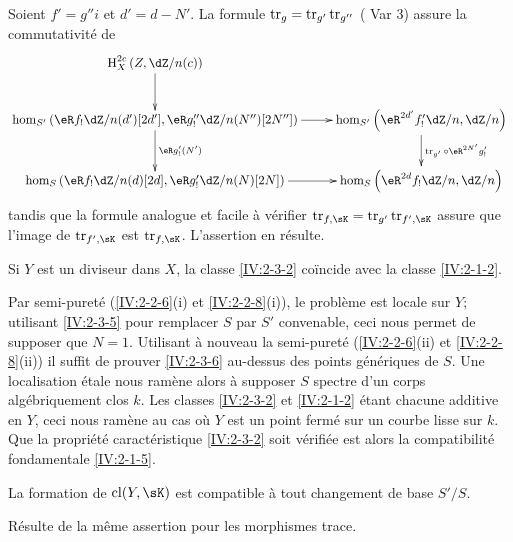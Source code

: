 Soient $f'=g'' i$ et $d'=d-N'$. La formule $\operatorname{tr}_g=\operatorname{tr}_{g'}\operatorname{tr}_{g''}$ 
(\cite[XVIII.2.9]{sga4} Var 3) assure la commutativité de 
\[\xymatrix{
  \h_X^{2 c}\left(Z,\dZ/n(c)\right) \ar[d] \\
  \hom_{S'}\left(\eR f_!\dZ/n(d')[2 d'],\eR g_!''\dZ/n(N'')[2 N'']\right) \ar[r] \ar[d]^-{\eR g_!'(N')} 
    & \hom_{S'}\left(\eR^{2 d'} f_!' \dZ/n,\dZ/n\right) \ar[d]^-{\tr_{g'}\circ \eR^{2 N'} g_!'} \\
  \hom_S\left(\eR f_!\dZ/n(d)[2d],\eR g_!'\dZ/n(N)[2 N]\right) \ar[r] 
    & \hom_S\left(\eR^{2 d} f_!\dZ/n,\dZ/n\right)
}\]
tandis que la formule analogue et facile à vérifier 
$\tr_{f,\sK}=\tr_{g'}\tr_{f',\sK}$ assure que l'image de $\tr_{f',\sK}$ est 
$\tr_{f,\sK}$. L'assertion en résulte. 





\begin{lemma}\label{IV:2-3-6}
Si $Y$ est un diviseur dans $X$, la classe \ref{IV:2-3-2} coïncide avec la 
classe \ref{IV:2-1-2}. 
\end{lemma}

Par semi-pureté (\ref{IV:2-2-6}(i) et \ref{IV:2-2-8}(i)), le problème est 
locale sur $Y$; utilisant \ref{IV:2-3-5} pour remplacer $S$ par $S'$ 
convenable, ceci nous permet de supposer que $N=1$. Utilisant à nouveau la 
semi-pureté (\ref{IV:2-2-6}(ii) et \ref{IV:2-2-8}(ii)) il suffit de prouver 
\ref{IV:2-3-6} au-dessus des points génériques de $S$. Une localisation 
étale nous ramène alors à supposer $S$ spectre d'un corps 
algébriquement clos $k$. Les classes \ref{IV:2-3-2} et \ref{IV:2-1-2} étant 
chacune additive en $Y$, ceci nous ramène au cas où $Y$ est un point 
fermé sur un courbe lisse sur $k$. Que la propriété caractéristique 
\ref{IV:2-3-2} soit vérifiée est alors la compatibilité fondamentale 
\ref{IV:2-1-5}. 





\begin{lemma}\label{IV:2-3-7}
La formation de $\cl(Y,\sK)$ est compatible à tout changement de base 
$S'/S$.
\end{lemma}

Résulte de la même assertion pour les morphismes trace.





